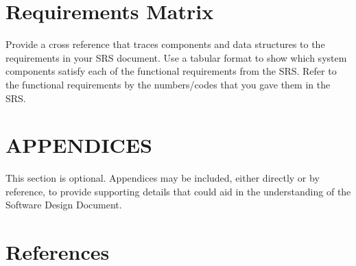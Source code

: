 \documentclass[12pt]{article}
\begin{document}
\section{Requirements Matrix}
Provide a cross reference that traces components and data structures to the requirements in your
SRS document.
Use  a  tabular  format to show  which system  components satisfy each of the  functional 
requirements from the SRS. Refer to the functional requirements by the numbers/codes that you 
gave them in the SRS.


\section{APPENDICES}
This section is optional.
Appendices may be included, either directly or by reference, to provide supporting details that could 
aid in the understanding of the Software Design Document.

\section {References}



\end{document}
